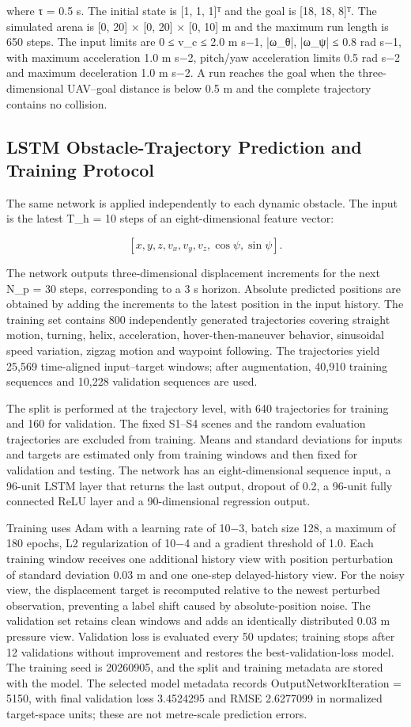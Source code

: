 \documentclass[10pt,a4paper]{article}
\begin{document}
where τ = 0.5 s. The initial state is [1, 1, 1]ᵀ and the goal is [18, 18, 8]ᵀ. The simulated arena is [0, 20] × [0, 20] × [0, 10] m and the maximum run length is 650 steps. The input limits are 0 ≤ v\_c ≤ 2.0 m s−1, |ω\_θ|, |ω\_ψ| ≤ 0.8 rad s−1, with maximum acceleration 1.0 m s−2, pitch/yaw acceleration limits 0.5 rad s−2 and maximum deceleration 1.0 m s−2. A run reaches the goal when the three-dimensional UAV–goal distance is below 0.5 m and the complete trajectory contains no collision.

\subsection{LSTM Obstacle-Trajectory Prediction and Training Protocol}

The same network is applied independently to each dynamic obstacle. The input is the latest T\_h = 10 steps of an eight-dimensional feature vector:

\[
[x,y,z,v_x,v_y,v_z,\cos\psi,\sin\psi].
\]

The network outputs three-dimensional displacement increments for the next N\_p = 30 steps, corresponding to a 3 s horizon. Absolute predicted positions are obtained by adding the increments to the latest position in the input history. The training set contains 800 independently generated trajectories covering straight motion, turning, helix, acceleration, hover-then-maneuver behavior, sinusoidal speed variation, zigzag motion and waypoint following. The trajectories yield 25,569 time-aligned input–target windows; after augmentation, 40,910 training sequences and 10,228 validation sequences are used.

The split is performed at the trajectory level, with 640 trajectories for training and 160 for validation. The fixed S1–S4 scenes and the random evaluation trajectories are excluded from training. Means and standard deviations for inputs and targets are estimated only from training windows and then fixed for validation and testing. The network has an eight-dimensional sequence input, a 96-unit LSTM layer that returns the last output, dropout of 0.2, a 96-unit fully connected ReLU layer and a 90-dimensional regression output.

Training uses Adam with a learning rate of 10−3, batch size 128, a maximum of 180 epochs, L2 regularization of 10−4 and a gradient threshold of 1.0. Each training window receives one additional history view with position perturbation of standard deviation 0.03 m and one one-step delayed-history view. For the noisy view, the displacement target is recomputed relative to the newest perturbed observation, preventing a label shift caused by absolute-position noise. The validation set retains clean windows and adds an identically distributed 0.03 m pressure view. Validation loss is evaluated every 50 updates; training stops after 12 validations without improvement and restores the best-validation-loss model. The training seed is 20260905, and the split and training metadata are stored with the model. The selected model metadata records OutputNetworkIteration = 5150, with final validation loss 3.4524295 and RMSE 2.6277099 in normalized target-space units; these are not metre-scale prediction errors.
\end{document}
